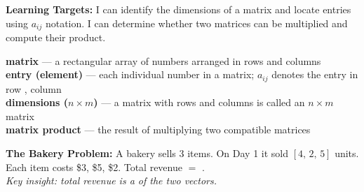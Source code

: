 \documentclass[10pt]{article}
\begin{document}
\namedateperiod

\vspace{0.1in}

\begin{objectivebox}
  \textbf{Learning Targets:}
  I can identify the dimensions of a matrix and locate entries using $a_{ij}$ notation. \quad
  I can determine whether two matrices can be multiplied and compute their product.
\end{objectivebox}

\vspace{0.08in}

\begin{vocabbox}
  \textbf{matrix} --- a rectangular array of numbers arranged in rows and columns\\[3pt]
  \textbf{entry (element)} --- each individual number in a matrix; $a_{ij}$ denotes the entry in row , column \\[3pt]
  \textbf{dimensions ($n \times m$)} --- a matrix with  rows and  columns is called an $n \times m$ matrix\\[3pt]
  \textbf{matrix product} --- the result of multiplying two compatible matrices
\end{vocabbox}

\vspace{0.08in}

\begin{hookbox}
  \textbf{The Bakery Problem:} A bakery sells 3 items. On Day 1 it sold $[4,\,2,\,5]$ units.
  Each item costs \$3, \$5, \$2. Total revenue $=$ .\\[4pt]
  \textit{Key insight: total revenue is a  of the two vectors.}
\end{hookbox}

\vspace{0.08in}
\end{document}
